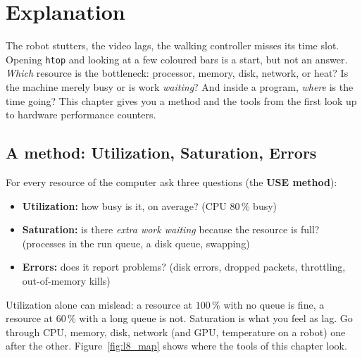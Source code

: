 \label{ch:linux8}

\section*{Explanation}
The robot stutters, the video lags, the walking controller misses its time slot. Opening \texttt{htop} and looking at a few coloured bars is a start, but not an answer. \emph{Which} resource is the bottleneck: processor, memory, disk, network, or heat? Is the machine merely busy or is work \emph{waiting}? And inside a program, \emph{where} is the time going? This chapter gives you a method and the tools from the first look up to hardware performance counters.

\subsection*{A method: Utilization, Saturation, Errors}
For every resource of the computer ask three questions (the \textbf{USE method}):
\begin{itemize}[nosep]
  \item \textbf{Utilization:} how busy is it, on average? (CPU $80\,\%$ busy)
  \item \textbf{Saturation:} is there \emph{extra work waiting} because the resource is full? (processes in the run queue, a disk queue, swapping)
  \item \textbf{Errors:} does it report problems? (disk errors, dropped packets, throttling, out-of-memory kills)
\end{itemize}
Utilization alone can mislead: a resource at $100\,\%$ with no queue is fine, a resource at $60\,\%$ with a long queue is not. Saturation is what you feel as lag. Go through CPU, memory, disk, network (and GPU, temperature on a robot) one after the other. Figure~\ref{fig:l8_map} shows where the tools of this chapter look.

